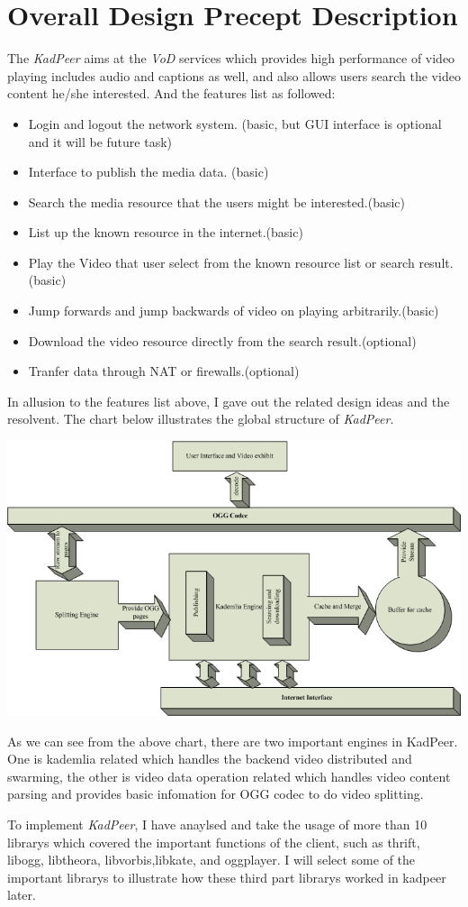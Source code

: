 \section{Overall Design Precept Description}
{

The \emph{KadPeer} aims at the \emph{VoD} services which provides high performance of video playing includes audio and captions as well, and also allows users search the video content he/she interested.
And the features list as followed:
\begin{itemize}
\item Login and logout the network system. (basic, but GUI interface is optional and it will be future task)
\item Interface to publish the media data. (basic)
\item Search the media resource that the users might be interested.(basic)
\item List up the known resource in the internet.(basic)
\item Play the Video that user select from the known resource list or search result.(basic)
\item Jump forwards and jump backwards of video on playing arbitrarily.(basic)
\item Download the video resource directly from the search result.(optional)
\item Tranfer data through NAT or firewalls.(optional)
\end{itemize}

In allusion to the features list above, I gave out the related design ideas and the resolvent.
The chart below illustrates the global structure of \emph{KadPeer}.
\begin{center}
\includegraphics[width=15cm]{data/KadPeerStructure.png}
\end{center}
As we can see from the above chart, there are two important engines in KadPeer.
One is kademlia related which handles the backend video distributed and swarming, the other is video data operation related which handles video content parsing and provides basic infomation for OGG codec to do video splitting.

To implement \emph{KadPeer}, I have anaylsed and take the usage of more than 10 librarys which covered the important functions of the client, such as thrift, libogg, libtheora, libvorbis,libkate, and oggplayer.
I will select some of the important librarys to illustrate how these third part librarys worked in kadpeer later.
}

